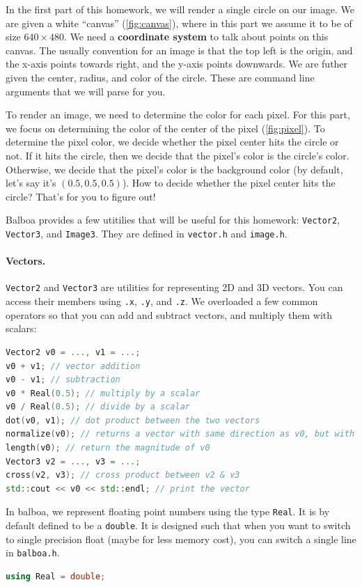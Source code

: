 In the first part of this homework, we will render a single circle on our image. We are given a white ``canvas'' (\cref{fig:canvas}), where in this part we assume it to be of size $640 \times 480$. We need a \textbf{coordinate system} to talk about points on this canvas. The usually convention for an image is that the top left is the origin, and the x-axis points towards right, and the y-axis points downwards. We are futher given the center, radius, and color of the circle. These are command line arguments that we will parse for you.

To render an image, we need to determine the color for each pixel. For this part, we focus on determining the color of the center of the pixel (\cref{fig:pixel}). To determine the pixel color, we decide whether the pixel center hits the circle or not. If it hits the circle, then we decide that the pixel's color is the circle's color. Otherwise, we decide that the pixel's color is the background color (by default, let's say it's $(0.5, 0.5, 0.5)$). How to decide whether the pixel center hits the circle? That's for you to figure out!

Balboa provides a few utitilies that will be useful for this homework: \lstinline{Vector2}, \lstinline{Vector3}, and \lstinline{Image3}. They are defined in \lstinline{vector.h} and \lstinline{image.h}. 

\paragraph{Vectors.} \lstinline{Vector2} and \lstinline{Vector3} are utilities for representing 2D and 3D vectors. You can access their members using \lstinline{.x}, \lstinline{.y}, and \lstinline{.z}. We overloaded a few common operators so that you can add and subtract vectors, and multiply them with scalars:
\begin{lstlisting}[language=C++]
Vector2 v0 = ..., v1 = ...;
v0 + v1; // vector addition
v0 - v1; // subtraction
v0 * Real(0.5); // multiply by a scalar
v0 / Real(0.5); // divide by a scalar
dot(v0, v1); // dot product between the two vectors
normalize(v0); // returns a vector with same direction as v0, but with magnitude of 1
length(v0); // return the magnitude of v0
Vector3 v2 = ..., v3 = ...;
cross(v2, v3); // cross product between v2 & v3
std::cout << v0 << std::endl; // print the vector
\end{lstlisting}
In balboa, we represent floating point numbers using the type \lstinline{Real}. It is by default defined to be a \lstinline{double}. It is designed such that when you want to switch to single precision float (maybe for less memory cost), you can switch a single line in \lstinline{balboa.h}.
\begin{lstlisting}[language=C++]
using Real = double;
\end{lstlisting}

